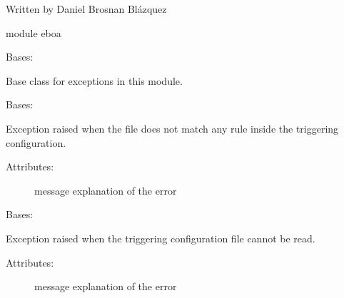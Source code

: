 Written by Daniel Brosnan Blázquez

module eboa

\begin{fulllineitems}
\label{\detokenize{eboa.triggering:eboa.triggering.errors.Error}}
Bases: 

Base class for exceptions in this module.

\end{fulllineitems}


\begin{fulllineitems}
\label{\detokenize{eboa.triggering:eboa.triggering.errors.FileDoesNotMatchAnyRule}}
Bases: {\hyperref[\detokenize{eboa.triggering:eboa.triggering.errors.Error}]{}}

Exception raised when the file does not match any rule inside the triggering configuration.
\begin{description}
\item[{Attributes:}] \leavevmode
message \textendash{} explanation of the error

\end{description}

\end{fulllineitems}


\begin{fulllineitems}
\label{\detokenize{eboa.triggering:eboa.triggering.errors.TriggeringConfigCannotBeRead}}
Bases: {\hyperref[\detokenize{eboa.triggering:eboa.triggering.errors.Error}]{}}

Exception raised when the triggering configuration file cannot be read.
\begin{description}
\item[{Attributes:}] \leavevmode
message \textendash{} explanation of the error

\end{description}

\end{fulllineitems}

